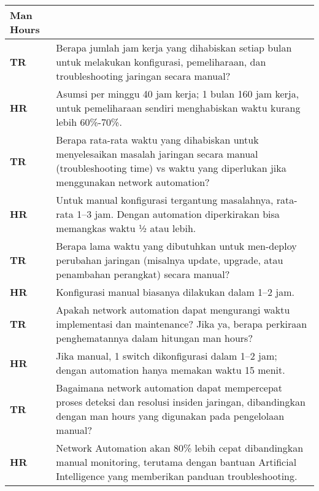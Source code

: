 \begin{longtable}{|p{4cm}|p{10cm}|}
    \textbf{Man Hours} & \\
    \hline
    \textbf{TR} & Berapa jumlah jam kerja yang dihabiskan setiap bulan untuk melakukan konfigurasi, pemeliharaan, dan troubleshooting jaringan secara manual? \\
    \textbf{HR} & Asumsi per minggu 40 jam kerja; 1 bulan 160 jam kerja, untuk pemeliharaan sendiri menghabiskan waktu kurang lebih 60\%-70\%. \\
    \hline
    \textbf{TR} & Berapa rata-rata waktu yang dihabiskan untuk menyelesaikan masalah jaringan secara manual (troubleshooting time) vs waktu yang diperlukan jika menggunakan network automation? \\
    \textbf{HR} & Untuk manual konfigurasi tergantung masalahnya, rata-rata 1–3 jam. Dengan automation diperkirakan bisa memangkas waktu ½ atau lebih. \\
    \hline
    \textbf{TR} & Berapa lama waktu yang dibutuhkan untuk men-deploy perubahan jaringan (misalnya update, upgrade, atau penambahan perangkat) secara manual? \\
    \textbf{HR} & Konfigurasi manual biasanya dilakukan dalam 1–2 jam. \\
    \hline
    \textbf{TR} & Apakah network automation dapat mengurangi waktu implementasi dan maintenance? Jika ya, berapa perkiraan penghematannya dalam hitungan man hours? \\
    \textbf{HR} & Jika manual, 1 switch dikonfigurasi dalam 1–2 jam; dengan automation hanya memakan waktu 15 menit. \\
    \hline
    \textbf{TR} & Bagaimana network automation dapat mempercepat proses deteksi dan resolusi insiden jaringan, dibandingkan dengan man hours yang digunakan pada pengelolaan manual? \\
    \textbf{HR} & Network Automation akan 80\% lebih cepat dibandingkan manual monitoring, terutama dengan bantuan Artificial Intelligence yang memberikan panduan troubleshooting. \\
    \hline

\end{longtable}
